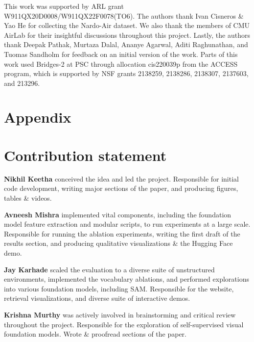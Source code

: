 \documentclass[letterpaper, 10 pt, conference]{ieeeconf}  \fi
\begin{document}
This work was supported by ARL grant W911QX20D0008/W911QX22F0078(TO6).
The authors thank Ivan Cisneros \& Yao He for collecting the Nardo-Air dataset.
We also thank the members of CMU AirLab for their insightful discussions throughout this project.
\ifarxiv
Lastly, the authors thank Deepak Pathak, Murtaza Dalal, Ananye Agarwal, Aditi Raghunathan, and Tuomas Sandholm for feedback on an initial version of the work.
Parts of this work used Bridges-2 at PSC through allocation cis220039p from the ACCESS program, which is supported by NSF grants 2138259, 2138286, 2138307, 2137603, and 213296.
\fi 

\ifarxiv

\section*{Appendix}

\setcounter{section}{0}
\setcounter{equation}{0}
\setcounter{figure}{0}
\setcounter{table}{0}

\renewcommand{\thesection}{A\arabic{section}}
\renewcommand{\thesubsection}{A\arabic{subsection}}
\renewcommand{\thefigure}{A.\arabic{figure}}
\renewcommand{\thetable}{A.\arabic{table}}
\renewcommand{\theequation}{A.\arabic{equation}}

\section{Contribution statement}

\textbf{Nikhil Keetha} conceived the idea and led the project. Responsible for initial code development, writing major sections of the paper, and producing figures, tables \& videos.

\textbf{Avneesh Mishra} implemented vital components, including the foundation model feature extraction and modular scripts, to run experiments at a large scale. Responsible for running the ablation experiments, writing the first draft of the results section, and producing qualitative visualizations \& the Hugging Face demo.

\textbf{Jay Karhade} scaled the evaluation to a diverse suite of unstructured environments, implemented the vocabulary ablations, and performed explorations into various foundation models, including SAM. Responsible for the website, retrieval visualizations, and diverse suite of interactive demos.

\textbf{Krishna Murthy} was actively involved in brainstorming and critical review throughout the project. Responsible for the exploration of self-supervised visual foundation models. Wrote \& proofread sections of the paper.
\end{document}
